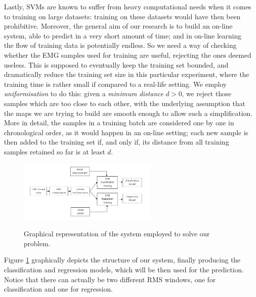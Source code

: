 Lastly, SVMs are known to suffer from heavy computational needs when
it comes to training on large datasets: training on these datasets
would have then been prohibitive. Moreover, the general aim of our
research is to build an on-line system, able to predict in a very
short amount of time; and in on-line learning the flow of training
data is potentially endless. So we need a way of checking whether the
EMG samples used for training are useful, rejecting the ones deemed
useless. This is supposed to eventually keep the training set bounded,
and dramatically reduce the training set size in this particular
experiment, where the training time is rather small if compared to a
real-life setting. We employ \emph{uniformisation}
\cite{2008.ICRA,2008.BioCyb} to do this: given a \emph{minimum
distance} $d > 0$, we reject those samples which are too close to each
other, with the underlying assumption that the maps we are trying to
build are smooth enough to allow such a simplification. More in
detail, the samples in a training batch are considered one by one in
chronological order, as it would happen in an on-line setting; each
new sample is then added to the training set if, and only if, its
distance from all training samples retained so far is at least
$d$.

\begin{figure}[!ht] \centering
  \includegraphics[width=0.6\textwidth]{figs/Schema} \\
  \caption{Graphical representation of the system employed to solve our problem.}
  \label{fig:Algorithm}
\end{figure}

Figure \ref{fig:Algorithm} graphically depicts the structure of our
system, finally producing the classification and regression models,
which will be then used for the prediction. Notice that there can
actually be two different RMS windows, one for classification and one
for regression.
